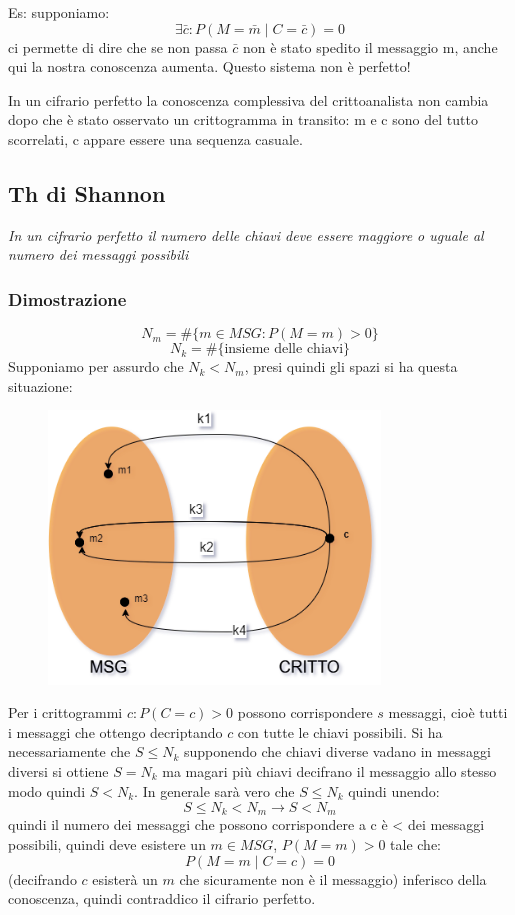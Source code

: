 Es: supponiamo:
$$\exists \bar{c} : P(M=\bar{m} \mid C=\bar{c}) = 0$$
ci permette di dire che se non passa $\bar{c}$ non è stato spedito il messaggio m, anche qui la nostra conoscenza aumenta. Questo sistema non è perfetto!

In un cifrario perfetto la conoscenza complessiva del crittoanalista non cambia dopo che è stato osservato un crittogramma in transito: m e c sono del tutto scorrelati, c appare essere una sequenza casuale.

\subsection{Th di Shannon}
\emph{In un cifrario perfetto il numero delle chiavi deve essere maggiore o uguale al numero dei messaggi possibili}
\subsubsection{Dimostrazione}
$$N_m = \#\{m \in MSG : P(M=m)>0\}$$
$$N_k = \#\{\text{insieme delle chiavi}\}$$
Supponiamo per assurdo che $N_k < N_m$, presi quindi gli spazi si ha questa situazione:

\begin{figure}[H]
  \centering
  \includegraphics[width = 250pt]{Shannon_proof.png}
\end{figure}

Per i crittogrammi $c : P(C=c) > 0$ possono corrispondere $s$ messaggi, cioè tutti i messaggi che ottengo decriptando $c$ con tutte le chiavi possibili. Si ha necessariamente che $S \leq N_k$ supponendo che chiavi diverse vadano in messaggi diversi si ottiene $S = N_k$ ma magari più chiavi decifrano il messaggio allo stesso modo quindi $S < N_k$. In generale sarà vero che $S \leq N_k$ quindi unendo:
$$ S \leq N_k < N_m \xrightarrow{} S < N_m $$
quindi il numero dei messaggi che possono corrispondere a c è < dei messaggi possibili, quindi deve esistere un $m \in MSG$, $P(M=m) > 0$ tale che:
$$ P(M=m \mid C=c) = 0 $$
(decifrando $c$ esisterà un $m$ che sicuramente non è il messaggio) inferisco della conoscenza, quindi contraddico il cifrario perfetto.

